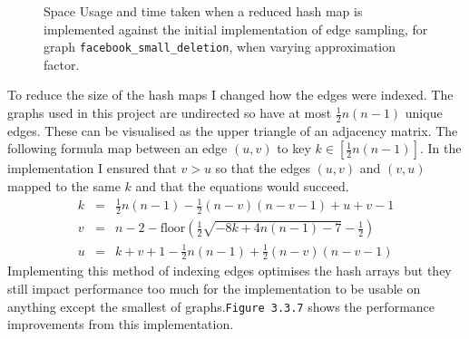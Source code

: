 \documentclass[11pt,twoside,a4paper]{report}
\begin{document}
\begin{figure}[H]
	\label{Figure 19}
	\caption{Space Usage and time taken when a reduced hash map is implemented against the initial implementation of edge sampling, for graph \texttt{facebook\_small\_deletion}, when varying approximation factor.}
\end{figure}

\par To reduce the size of the hash maps I changed how the edges were indexed. The graphs used in this project are undirected so have at most $\frac12n(n-1)$ unique edges. These can be visualised as the upper triangle of an adjacency matrix. The following formula map between an edge $(u,v)$ to key $k\in[\frac{1}{2}n(n-1)]$. In the implementation I ensured that $v>u$ so that the edges $(u,v)$ and $(v,u)$ mapped to the same $k$ and that the equations would succeed. %
\[\begin{array}{rcl}
k&=&\frac12n(n-1)-\frac12(n-v)(n-v-1)+u+v-1\\
v&=&n-2-\text{floor}\left(\frac{1}2\sqrt{-8k+4n(n-1)-7}-\frac{1}2\right)\\
u&=&k+v+1-\frac12n(n-1)+\frac12(n-v)(n-v-1)
\end{array}\]
Implementing this method of indexing edges optimises the hash arrays but they still impact performance too much for the implementation to be usable on anything except the smallest of graphs.\texttt{Figure 3.3.7} shows the performance improvements from this implementation.
\end{document}
